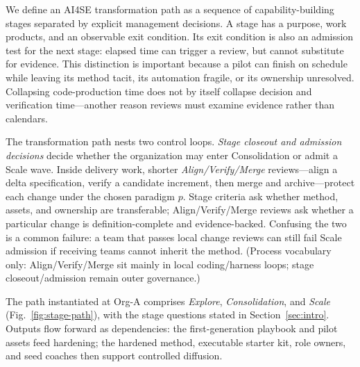 \documentclass[10pt,conference]{IEEEtran}
\begin{document}
We define an AI4SE transformation path as a sequence of capability-building
stages separated by explicit management decisions.  A stage has a purpose,
work products, and an observable exit condition.  Its exit condition is also
an admission test for the next stage: elapsed time can trigger a review, but
cannot substitute for evidence.  This distinction is important because a
pilot can finish on schedule while leaving its method tacit, its automation
fragile, or its ownership unresolved.
Collapsing code-production time does not by itself collapse decision and
verification time---another reason reviews must examine evidence rather than
calendars.

The transformation path nests two control loops.
\emph{Stage closeout and admission decisions} decide whether the organization may enter
Consolidation or admit a Scale wave.
Inside delivery work, shorter \emph{Align/Verify/Merge} reviews---align a delta
specification, verify a candidate increment, then merge and
archive---protect each change under the chosen paradigm \(p\).
Stage criteria ask whether method, assets, and ownership are transferable;
Align/Verify/Merge reviews ask whether a particular change is definition-complete and
evidence-backed.
Confusing the two is a common failure: a team that passes local change
reviews can still fail Scale admission if receiving teams cannot inherit the method.
(Process vocabulary only: Align/Verify/Merge sit mainly in local
coding/harness loops; stage closeout/admission remain outer governance.)

The path instantiated at Org-A comprises \emph{Explore},
\emph{Consolidation}, and \emph{Scale} (Fig.~\ref{fig:stage-path}), with the
stage questions stated in Section~\ref{sec:intro}.
Outputs flow forward as dependencies: the first-generation playbook and pilot
assets feed hardening; the hardened method, executable starter kit, role
owners, and seed coaches then support controlled diffusion.
\end{document}
